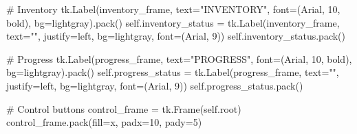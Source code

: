 \documentclass[
  letterpaper,
  DIV=11,
  numbers=noendperiod,
  oneside]{scrreprt}
\newenvironment{Shaded}{}{}
\newcommand{\CommentTok}[1]{\textcolor[rgb]{0.42,0.45,0.49}{#1}}
\newcommand{\DecValTok}[1]{\textcolor[rgb]{0.00,0.36,0.77}{#1}}
\newcommand{\NormalTok}[1]{\textcolor[rgb]{0.14,0.16,0.18}{#1}}
\newcommand{\OperatorTok}[1]{\textcolor[rgb]{0.14,0.16,0.18}{#1}}
\newcommand{\StringTok}[1]{\textcolor[rgb]{0.01,0.18,0.38}{#1}}
\newcommand{\VariableTok}[1]{\textcolor[rgb]{0.89,0.38,0.04}{#1}}
\begin{document}
\begin{Shaded}
\begin{Highlighting}[]
        \CommentTok{\# Inventory}
\NormalTok{        tk.Label(inventory\_frame, text}\OperatorTok{=}\StringTok{"INVENTORY"}\NormalTok{, font}\OperatorTok{=}\NormalTok{(}\StringTok{\textquotesingle{}Arial\textquotesingle{}}\NormalTok{, }\DecValTok{10}\NormalTok{, }\StringTok{\textquotesingle{}bold\textquotesingle{}}\NormalTok{), }
\NormalTok{                bg}\OperatorTok{=}\StringTok{\textquotesingle{}lightgray\textquotesingle{}}\NormalTok{).pack()}
        \VariableTok{self}\NormalTok{.inventory\_status }\OperatorTok{=}\NormalTok{ tk.Label(inventory\_frame, text}\OperatorTok{=}\StringTok{""}\NormalTok{, justify}\OperatorTok{=}\StringTok{\textquotesingle{}left\textquotesingle{}}\NormalTok{, }
\NormalTok{                                        bg}\OperatorTok{=}\StringTok{\textquotesingle{}lightgray\textquotesingle{}}\NormalTok{, font}\OperatorTok{=}\NormalTok{(}\StringTok{\textquotesingle{}Arial\textquotesingle{}}\NormalTok{, }\DecValTok{9}\NormalTok{))}
        \VariableTok{self}\NormalTok{.inventory\_status.pack()}
        
        \CommentTok{\# Progress}
\NormalTok{        tk.Label(progress\_frame, text}\OperatorTok{=}\StringTok{"PROGRESS"}\NormalTok{, font}\OperatorTok{=}\NormalTok{(}\StringTok{\textquotesingle{}Arial\textquotesingle{}}\NormalTok{, }\DecValTok{10}\NormalTok{, }\StringTok{\textquotesingle{}bold\textquotesingle{}}\NormalTok{), }
\NormalTok{                bg}\OperatorTok{=}\StringTok{\textquotesingle{}lightgray\textquotesingle{}}\NormalTok{).pack()}
        \VariableTok{self}\NormalTok{.progress\_status }\OperatorTok{=}\NormalTok{ tk.Label(progress\_frame, text}\OperatorTok{=}\StringTok{""}\NormalTok{, justify}\OperatorTok{=}\StringTok{\textquotesingle{}left\textquotesingle{}}\NormalTok{, }
\NormalTok{                                       bg}\OperatorTok{=}\StringTok{\textquotesingle{}lightgray\textquotesingle{}}\NormalTok{, font}\OperatorTok{=}\NormalTok{(}\StringTok{\textquotesingle{}Arial\textquotesingle{}}\NormalTok{, }\DecValTok{9}\NormalTok{))}
        \VariableTok{self}\NormalTok{.progress\_status.pack()}
        
        \CommentTok{\# Control buttons}
\NormalTok{        control\_frame }\OperatorTok{=}\NormalTok{ tk.Frame(}\VariableTok{self}\NormalTok{.root)}
\NormalTok{        control\_frame.pack(fill}\OperatorTok{=}\StringTok{\textquotesingle{}x\textquotesingle{}}\NormalTok{, padx}\OperatorTok{=}\DecValTok{10}\NormalTok{, pady}\OperatorTok{=}\DecValTok{5}\NormalTok{)}
        

\end{Highlighting}
\end{Shaded}
\end{document}

